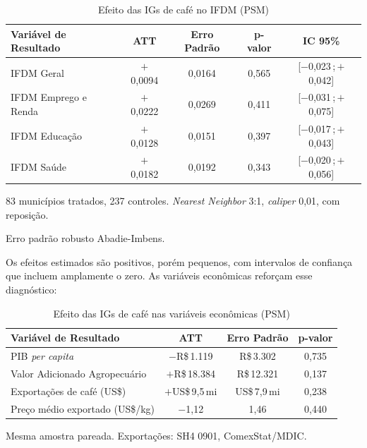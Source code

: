 \documentclass[12pt, a4paper]{article}
\begin{document}
\begin{table}[htbp]
\centering
\caption{Efeito das IGs de café no IFDM (PSM)}
\label{tab:psm_cafe}
\begin{threeparttable}
\begin{tabular}{lcccc}
\toprule
Variável de Resultado & ATT & Erro Padrão & p-valor & IC 95\% \\
\midrule
IFDM Geral           & $+$0,0094 & 0,0164 & 0,565 & [$-$0,023\,;\,$+$0,042] \\
IFDM Emprego e Renda & $+$0,0222 & 0,0269 & 0,411 & [$-$0,031\,;\,$+$0,075] \\
IFDM Educação        & $+$0,0128 & 0,0151 & 0,397 & [$-$0,017\,;\,$+$0,043] \\
IFDM Saúde           & $+$0,0182 & 0,0192 & 0,343 & [$-$0,020\,;\,$+$0,056] \\
\bottomrule
\end{tabular}
\begin{tablenotes}
\small
\item 83 municípios tratados, 237 controles. \textit{Nearest Neighbor} 3:1, \textit{caliper} 0,01, com reposição.
\item Erro padrão robusto Abadie-Imbens.
\end{tablenotes}
\end{threeparttable}
\end{table}

Os efeitos estimados são positivos, porém pequenos, com intervalos de confiança que incluem amplamente o zero. As variáveis econômicas reforçam esse diagnóstico:

\begin{table}[htbp]
\centering
\caption{Efeito das IGs de café nas variáveis econômicas (PSM)}
\label{tab:psm_cafe_econ}
\begin{threeparttable}
\begin{tabular}{lccc}
\toprule
Variável de Resultado & ATT & Erro Padrão & p-valor \\
\midrule
PIB \textit{per capita}         & $-$R\$\,1.119     & R\$\,3.302    & 0,735 \\
Valor Adicionado Agropecuário   & $+$R\$\,18.384    & R\$\,12.321   & 0,137 \\
Exportações de café (US\$)      & $+$US\$\,9,5\,mi  & US\$\,7,9\,mi & 0,238 \\
Preço médio exportado (US\$/kg) & $-$1,12           & 1,46          & 0,440 \\
\bottomrule
\end{tabular}
\begin{tablenotes}
\small
\item Mesma amostra pareada. Exportações: SH4 0901, ComexStat/MDIC.
\end{tablenotes}
\end{threeparttable}
\end{table}
\end{document}
